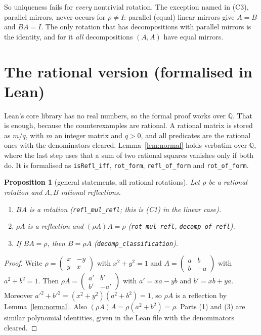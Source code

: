 \documentclass[11pt]{article}
\newtheorem{proposition}[theorem]{Proposition}
\theoremstyle{definition}
\theoremstyle{remark}
\newcommand{\Q}{\mathbb Q}
\begin{document}
So uniqueness fails for \emph{every} nontrivial rotation. The exception named in (C3), parallel
mirrors, never occurs for $\rho\neq I$: parallel (equal) linear mirrors give $A=B$ and
$BA=I$. The only rotation that has decompositions with parallel mirrors is the identity, and
for it \emph{all} decompositions $(A,A)$ have equal mirrors.

\section{The rational version (formalised in Lean)}

Lean's core library has no real numbers, so the formal proof works over $\Q$. That is enough,
because the counterexamples are rational. A rational matrix is stored as $m/q$, with $m$ an
integer matrix and $q>0$, and all predicates are the rational ones with the denominators
cleared. Lemma~\ref{lem:normal} holds verbatim over $\Q$, where the last step uses that a sum
of two rational squares vanishes only if both do. It is formalised as \texttt{isRefl\_iff},
\texttt{rot\_form}, \texttt{refl\_of\_form} and \texttt{rot\_of\_form}.

\begin{proposition}[general statements, all rational rotations]\label{prop:general}
Let $\rho$ be a rational rotation and $A,B$ rational reflections.
\begin{enumerate}
\item $BA$ is a rotation (\texttt{refl\_mul\_refl}; this is (C1) in the linear case).
\item $\rho A$ is a reflection and $(\rho A)A=\rho$ (\texttt{rot\_mul\_refl},
\texttt{decomp\_of\_refl}).
\item If $BA=\rho$, then $B=\rho A$ (\texttt{decomp\_classification}).
\end{enumerate}
\end{proposition}
\begin{proof}
Write $\rho=\left(\begin{smallmatrix}x&-y\\ y&x\end{smallmatrix}\right)$ with $x^2+y^2=1$ and
$A=\left(\begin{smallmatrix}a&b\\ b&-a\end{smallmatrix}\right)$ with $a^2+b^2=1$. Then
$\rho A=\left(\begin{smallmatrix}a'&b'\\ b'&-a'\end{smallmatrix}\right)$ with $a'=xa-yb$ and
$b'=xb+ya$. Moreover $a'^2+b'^2=(x^2+y^2)(a^2+b^2)=1$, so $\rho A$ is a reflection by
Lemma~\ref{lem:normal}. Also $(\rho A)A=\rho(a^2+b^2)=\rho$. Parts (1) and (3) are similar
polynomial identities, given in the Lean file with the denominators cleared.
\end{proof}
\end{document}
